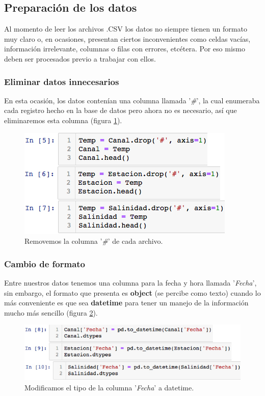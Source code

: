 \documentclass[12pt]{article}
\begin{document}
\subsection{Preparación de los datos}

\noindent Al momento de leer los archivos .CSV los datos no siempre tienen un formato muy claro o, en ocasiones, presentan ciertos inconvenientes como celdas vacías, información irrelevante, columnas o filas con errores, etcétera. Por eso mismo deben ser procesados previo a trabajar con ellos.

\subsubsection{Eliminar datos innecesarios}

\noindent En esta ocasión, los datos contenían una columna llamada '\textit{\#}', la cual enumeraba cada registro hecho en la base de datos pero ahora no es necesario, así que eliminaremos esta columna (figura \ref{fig:eliminar}).

\begin{figure}[h!]
	\center
	\includegraphics[scale=.6]{./Images/eliminar}
	\caption{\label{fig:eliminar} Removemos la columna '\textit{\#}' de cada archivo.}
\end{figure}

\subsubsection{Cambio de formato}

\noindent Entre nuestros datos tenemos una columna para la fecha y hora llamada '\textit{Fecha}', sin embargo, el formato que presenta es \textbf{object} (se percibe como texto) cuando lo más conveniente es que sea \textbf{datetime} para tener un manejo de la información mucho más sencillo (figura \ref{fig:formato}).

\begin{figure}[h!]
	\center
	\includegraphics[scale=.6]{./Images/formato}
	\caption{\label{fig:formato} Modificamos el tipo de la columna '\textit{Fecha}' a datetime.}
\end{figure}
\end{document}
